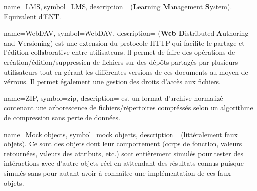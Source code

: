   {
	name=LMS,
	symbol=LMS,
	description={
	  ({\bf L}earning {\bf M}anagement {\bf S}ystem). Equivalent d'ENT.
	}
  }

  {
	name=WebDAV,
	symbol=WebDAV,
	description={
	  ({\bf Web D}istributed {\bf A}uthoring and {\bf V}ersioning) est une
	  extension du protocole HTTP qui facilite le partage et l'édition
	  collaborative entre utilisateurs. Il permet de faire des opérations de
	  création/édition/suppression de fichiers sur des dépôts partagés par
	  plusieurs utilisateurs tout en gérant les différentes versions de ces
	  documents au moyen de vérrous. Il permet également une gestion des droits
	  d'accès aux fichiers.
	}
  }

  {
	name=ZIP,
	symbol=zip,
	description={
	  est un format d'archive normalizé contenant une arborescence de
	  fichiers/répertoires compréssés selon un algorithme de compression sans
	  perte de données.
	}
  }

  {
	name=Mock objects,
	symbol=mock objects,
	description={
	  (littéralement faux objets). Ce sont des objets dont leur comportement
	  (corps de fonction, valeurs retournées, valeurs des attributs, etc.) sont
	  entièrement simulés pour tester des intéractions avec d'autre objets réel
	  en atttendant des résultats connus puisque simulés sans pour autant avoir
	  à connaître une implémentation de ces faux objets.
	}
  }


